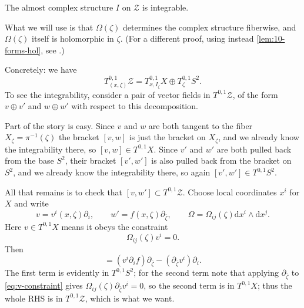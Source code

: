 \documentclass[12pt,letterpaper,reqno]{article}
\numberwithin{equation}{section}
\newcommand{\cZ}{\ensuremath{\mathcal Z}}
\newcommand{\de}{\mathrm{d}}
\begin{document}
\begin{prop} The almost complex structure $I$ on $\cZ$ is integrable.
\end{prop}
\begin{pf}
What we will use is that $\Omega(\zeta)$ determines the complex structure fiberwise,
and $\Omega(\zeta)$ itself is holomorphic in $\zeta$.
(For a different proof, using instead \autoref{lem:10-forms-hol},
see \cite{Hitchin:1986ea}.)

Concretely: we have
\begin{equation}
T^{0,1}_{(x,\zeta)} \cZ = T^{0,1}_{x,I_\zeta} X \oplus T^{0,1}_\zeta S^2.
\end{equation}
To see the integrability, consider a pair of vector fields in $T^{0,1} \cZ$,
of the form $v \oplus v'$
and $w \oplus w'$ with respect to this decomposition.

Part of the story is easy.
Since $v$ and $w$ are both tangent to the fiber $X_{\zeta} = \pi^{-1}(\zeta)$
the bracket $[v,w]$ is just the bracket on $X_{\zeta}$, and we already
know the integrability there, so $[v,w] \in T^{0,1} X$.
Since $v'$ and $w'$ are both pulled back from the base $S^2$,
their bracket $[v',w']$ is also pulled back from the bracket on $S^2$,
and we already know the integrability there, so again $[v',w'] \in T^{0,1} S^2$.

All that remains is to check
that $[v,w'] \subset T^{0,1} \cZ$.
Choose local coordinates $x^i$ for $X$ and write
\begin{equation}
v = v^i(x,\zeta) \partial_i, \qquad w' = f(x,\zeta) \partial_{\bar \zeta}, \qquad
\Omega = \Omega_{ij}(\zeta) \de x^i \wedge \de x^j.
\end{equation}
Here $v \in T^{0,1} X$ means it obeys the constraint
\begin{equation} \label{eq:v-constraint}
\Omega_{ij}(\zeta) v^i = 0.
\end{equation}
Then
\begin{equation}
 [v, f \partial_{\bar \zeta}] = (v^i \partial_i f) \partial_{\bar \zeta} - (\partial_{\bar \zeta} v^i) \partial_i.
\end{equation}
The first term is evidently in $T^{0,1} S^2$; for the second term note that
applying $\partial_{\bar \zeta}$ to \eqref{eq:v-constraint}
gives $\Omega_{ij}(\zeta) \partial_{\bar \zeta} v^i = 0$,
so the second term is in $T^{0,1} X$; thus the whole RHS is
in $T^{0,1} \cZ$, which is what we want.
\end{pf}
\end{document}
